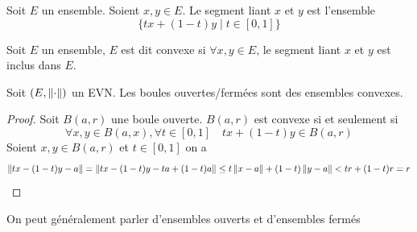 \begin{definition}
 Soit $E$ un ensemble. Soient $x,y\in E$. Le segment liant $x$ et $y$ est l'ensemble
 \[
 \{tx+(1-t)y\mid t\in [0,1]\}
 \]
\end{definition}
\begin{definition}
    Soit $E$ un ensemble, $E$ est dit convexe si $\forall x,y\in E$, le segment liant $x$ et $y$ est inclus dans $E$.
\end{definition}
\begin{proposition}
    Soit $(E,\left\| \cdot \right\|)$ un EVN. Les boules ouvertes/fermées sont des ensembles convexes.
\end{proposition}
\begin{proof}
    Soit $B(a,r)$ une boule ouverte. $B(a,r)$ est convexe si et seulement si
    \[
    \forall x,y\in B(a,x), \forall t\in [0,1] \quad tx+(1-t)y\in B(a,r)
    \]
    Soient $x,y\in B(a,r)$ et $t\in [0,1]$ on a
    \[
    \left\| tx-(1-t)y-a \right\|=\left\| tx-(1-t)y-ta+(1-t)a \right\|\leq t\left\| x-a \right\|+(1-t)\left\| y-a \right\|<tr+(1-t)r=r
    \]
\end{proof}

On peut généralement parler d'ensembles ouverts et d'ensembles fermés

